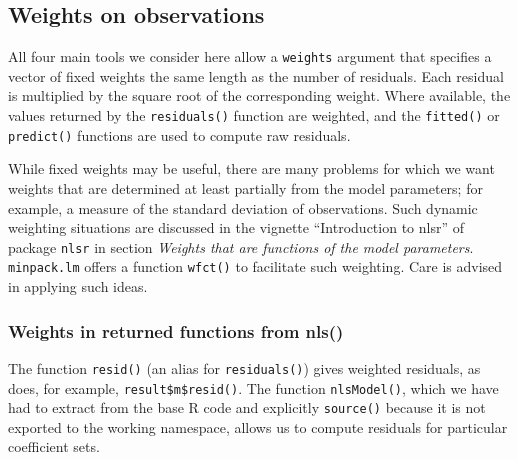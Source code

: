 \documentclass[
]{article}
\begin{document}
\hypertarget{weights-on-observations}{%
\subsection{Weights on observations}\label{weights-on-observations}}

All four main tools we consider here allow a \texttt{weights} argument
that specifies a vector of fixed weights the same length as the number
of residuals. Each residual is multiplied by the square root of the
corresponding weight. Where available, the values returned by the
\texttt{residuals()} function are weighted, and the \texttt{fitted()} or
\texttt{predict()} functions are used to compute raw residuals.

While fixed weights may be useful, there are many problems for which we
want weights that are determined at least partially from the model
parameters; for example, a measure of the standard deviation of
observations. Such dynamic weighting situations are discussed in the
vignette ``Introduction to nlsr'' of package \texttt{nlsr} in section
\emph{Weights that are functions of the model parameters}.
\texttt{minpack.lm} offers a function \texttt{wfct()} to facilitate such
weighting. Care is advised in applying such ideas.

\hypertarget{weights-in-returned-functions-from-nls}{%
\subsubsection{Weights in returned functions from
nls()}\label{weights-in-returned-functions-from-nls}}

The function \texttt{resid()} (an alias for \texttt{residuals()}) gives
weighted residuals, as does, for example, \texttt{result\$m\$resid()}.
The function \texttt{nlsModel()}, which we have had to extract from the
base R code and explicitly \texttt{source()} because it is not exported
to the working namespace, allows us to compute residuals for particular
coefficient sets.
\end{document}
